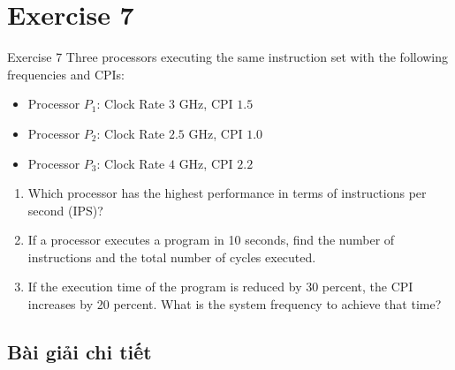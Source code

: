 \documentclass[a4paper]{article}
\numberwithin{figure}{section}
\numberwithin{table}{section}
\begin{document}
\pagebreak

\section{Exercise 7}

\begin{problembox}{Exercise 7}
Three processors executing the same instruction set with the following frequencies and CPIs:
\begin{itemize}
    \item Processor $P_1$: Clock Rate $3\text{ GHz}$, CPI $1.5$
    \item Processor $P_2$: Clock Rate $2.5\text{ GHz}$, CPI $1.0$
    \item Processor $P_3$: Clock Rate $4\text{ GHz}$, CPI $2.2$
\end{itemize}
\begin{enumerate}[label=\textbf{\alph*.}]
    \item Which processor has the highest performance in terms of instructions per second (IPS)?
    \item If a processor executes a program in 10 seconds, find the number of instructions and the total number of cycles executed.
    \item If the execution time of the program is reduced by 30 percent, the CPI increases by 20 percent. What is the system frequency to achieve that time?
\end{enumerate}
\end{problembox}

\subsection{Bài giải chi tiết}
\end{document}
